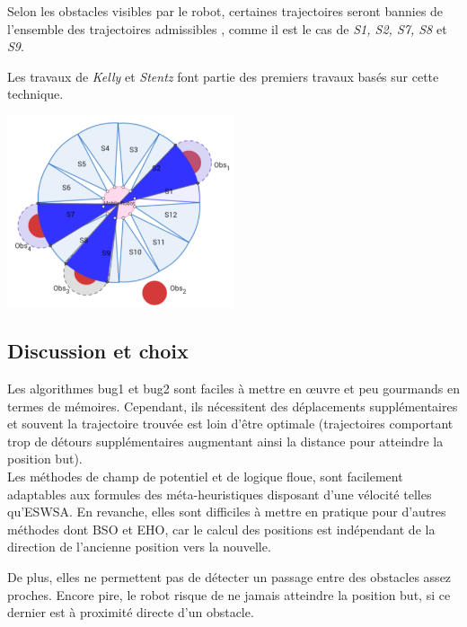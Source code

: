 Selon les obstacles visibles par le robot, certaines trajectoires seront bannies de l'ensemble des trajectoires admissibles \cite{Sara}, comme il est le cas de \textit{S1, S2, S7, S8} et \textit{S9}.
		
Les travaux de \textit{Kelly} et \textit{Stentz} \cite{echantillonnage} font partie des premiers travaux basés sur cette technique.
		
\begin{center}	  
	\includegraphics[width=0.5\textwidth]{../Figures/echan.png}%
	\vspace{-0.1 cm}
	\label{ech}%
\end{center}


\subsection{Discussion et choix}
Les algorithmes bug1 et bug2 sont faciles à mettre en œuvre et peu gourmands en termes de  mémoires. Cependant, ils nécessitent des déplacements supplémentaires et souvent la trajectoire trouvée est loin d'être optimale (trajectoires comportant trop de détours supplémentaires augmentant ainsi la distance pour atteindre la position but).\\ 

Les méthodes de champ de potentiel et de logique floue, sont facilement adaptables aux formules des méta-heuristiques disposant d’une vélocité telles qu'ESWSA. En revanche, elles sont difficiles à mettre en pratique pour d'autres méthodes dont BSO et EHO, car le calcul des positions est indépendant de la direction de l’ancienne position vers la nouvelle.

De plus, elles ne permettent pas de détecter un passage entre des obstacles assez proches. Encore pire, le robot risque de ne jamais atteindre la position but, si ce dernier est à proximité directe d'un obstacle.\\  

